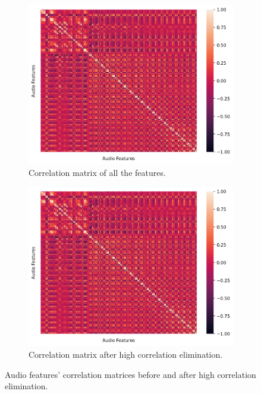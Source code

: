 \begin{figure}
	\begin{subfigure}{.5\textwidth}
		\centering
		\includegraphics[width=\linewidth]{figs/4_1_traditional/allCorrMatrix.png}
		\caption{Correlation matrix of all the features.}
		\label{fig:allAudioFeat}
	\end{subfigure}%
	\begin{subfigure}{.5\textwidth}
		\centering
		\includegraphics[width=\linewidth]{figs/4_1_traditional/highCorrMatrix.png}
		\caption{Correlation matrix after high correlation elimination.}
		\label{fig:highAudioFeat}
	\end{subfigure}
	\caption{Audio features' correlation matrices before and after high correlation elimination.}
\end{figure}



